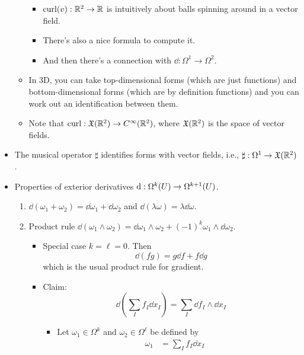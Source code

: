 \documentclass[../notes.tex]{subfiles}
\begin{document}
\begin{itemize}
\begin{itemize}
        \begin{itemize}
            \item $\crl(v):\R^2\to\R$ is intuitively about balls spinning around in a vector field.
            \item There's also a nice formula to compute it.
            \item And then there's a connection with $\dd:\Omega^1\to\Omega^2$.
        \end{itemize}
        \item In 3D, you can take top-dimensional forms (which are just functions) and bottom-dimensional forms (which are by definition functions) and you can work out an identification between them.
        \item Note that $\crl:\mathfrak{X}(\R^2)\to C^\infty(\R^2)$, where $\mathfrak{X}(\R^2)$ is the space of vector fields.
    \end{itemize}
    \item The musical operator $\sharp$ identifies forms with vector fields, i.e., $\sharp:\Omega^1\to\mathfrak{X}(\R^2)$.
    \item Properties of exterior derivatives $\dd:\ome[k]{U}\to\ome[k+1]{U}$.
    \begin{enumerate}
        \item $\dd{(\omega_1+\omega_2)}=\dd{\omega_1}+\dd{\omega_2}$ and $\dd{(\lambda\omega)}=\lambda\dd{\omega}$.
        \item Product rule $\dd{(\omega_1\wedge\omega_2)}=\dd{\omega_1}\wedge\omega_2+(-1)^k\omega_1\wedge\dd{\omega_2}$.
        \begin{itemize}
            \item Special case $k=\ell=0$. Then
            \begin{equation*}
                \dd{(fg)} = g\dd{f}+f\dd{g}
            \end{equation*}
            which is the usual product rule for gradient.
            \item Claim:
            \begin{equation*}
                \dd{\left( \sum_If_I\dd{x_I} \right)} = \sum_I\dd{f_I}\wedge\dd{x_I}
            \end{equation*}
            \begin{itemize}
                \item Let $\omega_1\in\Omega^k$ and $\omega_2\in\Omega^\ell$ be defined by
                \begin{align*}
                    \omega_1 &= \sum_If_I\dd{x_I}&

\end{align*}
\end{itemize}
\end{itemize}
\end{enumerate}
\end{itemize}
\end{document}
